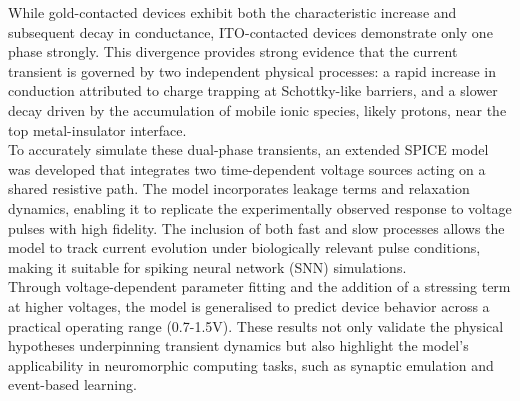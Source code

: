 \noindent While gold-contacted devices exhibit both the characteristic increase and subsequent decay in conductance, ITO-contacted devices demonstrate only one phase strongly. This divergence provides strong evidence that the current transient is governed by two independent physical processes: a rapid increase in conduction attributed to charge trapping at Schottky-like barriers, and a slower decay driven by the accumulation of mobile ionic species, likely protons, near the top metal-insulator interface.\\

\noindent To accurately simulate these dual-phase transients, an extended SPICE model was developed that integrates two time-dependent voltage sources acting on a shared resistive path. The model incorporates leakage terms and relaxation dynamics, enabling it to replicate the experimentally observed response to voltage pulses with high fidelity. The inclusion of both fast and slow processes allows the model to track current evolution under biologically relevant pulse conditions, making it suitable for spiking neural network (SNN) simulations.\\

\noindent Through voltage-dependent parameter fitting and the addition of a stressing term at higher voltages, the model is generalised to predict device behavior across a practical operating range (0.7-1.5V). These results not only validate the physical hypotheses underpinning transient dynamics but also highlight the model's applicability in neuromorphic computing tasks, such as synaptic emulation and event-based learning.